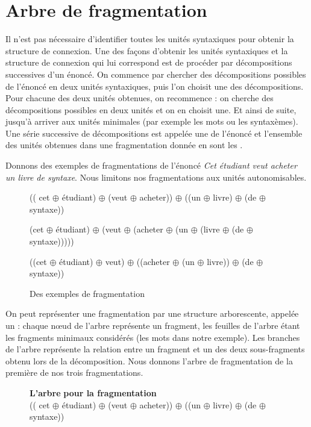 \section{Arbre de fragmentation}\label{sec:3.2.21}

Il n’est pas nécessaire d’identifier toutes les unités syntaxiques pour obtenir la structure de connexion. Une des façons d’obtenir les unités syntaxiques et la structure de connexion qui lui correspond est de procéder par décompositions successives d’un énoncé. On commence par chercher des décompositions possibles de l’énoncé en deux unités syntaxiques, puis l’on choisit une des décompositions. Pour chacune des deux unités obtenues, on recommence : on cherche des décompositions possibles en deux unités et on en choisit une. Et ainsi de suite, jusqu’à arriver aux unités minimales (par exemple les mots ou les syntaxèmes). Une série successive de décompositions est appelée une  de l’énoncé et l’ensemble des unités obtenues dans une fragmentation donnée en sont les .

Donnons des exemples de fragmentations de l’énoncé \textit{Cet étudiant veut acheter un livre de syntaxe}. Nous limitons nos fragmentations aux unités autonomisables.

\begin{figure}
   (( cet ${\oplus}$ étudiant) ${\oplus}$ (veut ${\oplus}$ acheter)) ${\oplus}$ ((un ${\oplus}$ livre) ${\oplus}$ (de ${\oplus}$ syntaxe))

   (cet ${\oplus}$ étudiant) ${\oplus}$ (veut ${\oplus}$ (acheter ${\oplus}$ (un ${\oplus}$  (livre ${\oplus}$ (de ${\oplus}$ syntaxe)))))

   ((cet ${\oplus}$ étudiant) ${\oplus}$  veut) ${\oplus}$ ((acheter ${\oplus}$ (un ${\oplus}$ livre)) ${\oplus}$ (de ${\oplus}$ syntaxe))

   \caption{\label{fig:}Des exemples de fragmentation}
\end{figure}

On peut représenter une fragmentation par une structure arborescente, appelée un  : chaque nœud de l’arbre représente un fragment, les feuilles de l’arbre étant les fragments minimaux considérés (les mots dans notre exemple). Les branches de l’arbre représente la relation entre un fragment et un des deux sous-fragments obtenu lors de la décomposition. Nous donnons l’arbre de fragmentation de la première de nos trois fragmentations.

\begin{figure}

\textbf{L’arbre} \textbf{pour la fragmentation\\
}(( cet ${\oplus}$ étudiant) ${\oplus}$ (veut ${\oplus}$ acheter)) ${\oplus}$ ((un ${\oplus}$ livre) ${\oplus}$ (de ${\oplus}$ syntaxe))
\caption{\label{fig:}}
\end{figure}

